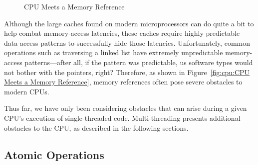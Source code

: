 \begin{figure}[htb]
\centering
{}
\caption{CPU Meets a Memory Reference}
\end{figure}

Although the large caches found on modern microprocessors can do quite
a bit to help combat memory-access latencies,
these caches require highly predictable data-access patterns to
successfully hide those latencies.
Unfortunately, common operations such as traversing a linked list
have extremely unpredictable memory-access patterns---after all,
if the pattern was predictable, us software types would not bother
with the pointers, right?
Therefore, as shown in
Figure~\ref{fig:cpu:CPU Meets a Memory Reference},
memory references often pose severe obstacles to modern CPUs.

Thus far, we have only been considering obstacles that can arise during
a given CPU's execution of single-threaded code.
Multi-threading presents additional obstacles to the CPU, as
described in the following sections.

\subsection{Atomic Operations}
\label{sec:cpu:Atomic Operations}

